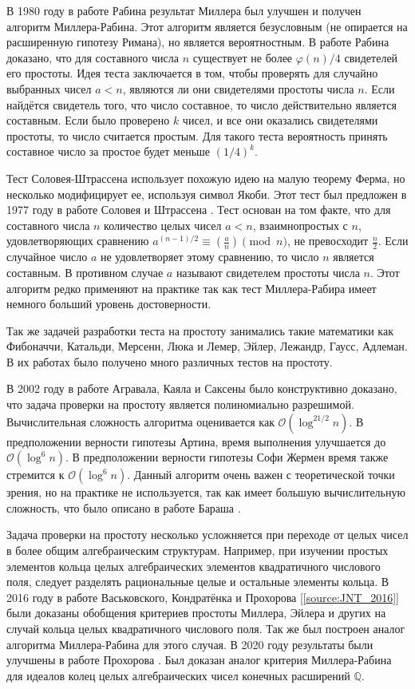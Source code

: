 \documentclass[_00_dissertation.tex]{subfiles}
\begin{document}
В 1980 году в работе Рабина \cite{Rabin} результат Миллера был улучшен и получен алгоритм Миллера-Рабина.
Этот алгоритм является безусловным (не опирается на расширенную гипотезу Римана), но является вероятностным.
В работе Рабина доказано, что для составного числа $n$ существует не более $\varphi(n)/4$ свидетелей его простоты.
Идея теста заключается в том, чтобы проверять для случайно выбранных чисел $a < n$, являются ли они свидетелями простоты числа $n$.
Если найдётся свидетель того, что число составное, то число действительно является составным.
Если было проверено $k$ чисел, и все они оказались свидетелями простоты, то число считается простым.
Для такого теста вероятность принять составное число за простое будет меньше $(1/4)^{k}$.

Тест Соловея-Штрассена использует похожую идею на малую теорему Ферма, но несколько модифицирует ее, используя символ Якоби.
Этот тест был предложен в 1977 году в работе Соловея и Штрассена \cite{Solovay}.
Тест основан на том факте, что для составного числа $n$ количество целых чисел $a < n$, взаимнопростых с $n$, удовлетворяющих сравнению $a^{{(n-1)/2}}\equiv \left({\frac{a}{n}}\right){\pmod{n}}$, не превосходит $\frac{n}{2}$.
Если случайное число $a$ не удовлетворяет этому сравнению, то число $n$ является составным.
В противном случае $a$ называют свидетелем простоты числа $n$.
Этот алгоритм редко применяют на практике так как тест Миллера-Рабира имеет немного больший уровень достоверности.

Так же задачей разработки теста на простоту занимались такие математики как Фибоначчи, Катальди, Мерсенн, Люка и Лемер, Эйлер, Лежандр, Гаусс, Адлеман.
В их работах было получено много различных тестов на простоту.

В 2002 году в работе Агравала, Каяла и Саксены \cite{AKS} было конструктивно доказано, что задача проверки на простоту является полиномиально разрешимой.
Вычислительная сложность алгоритма оценивается как $\mathcal{O}(\log ^{21/2}n)$.
В предположении верности гипотезы Артина, время выполнения улучшается до $\mathcal{O}(\log ^{6}n)$.
В предположении верности гипотезы Софи Жермен время также стремится к $\mathcal{O}(\log ^{6}n)$.
Данный алгоритм очень важен с теоретической точки зрения, но на практике не используется, так как имеет большую вычислительную сложность, что было описано в работе Бараша \cite{Barash}.

Задача проверки на простоту несколько усложняется при переходе от целых чисел в более общим алгебраическим структурам.
Например, при изучении простых элементов кольца целых алгебраических элементов квадратичного числового поля, следует разделять рациональные целые и остальные элементы кольца.
В 2016 году в работе Васьковского, Кондратёнка и Прохорова [\ref{source:JNT_2016}] были доказаны обобщения критериев простоты Миллера, Эйлера и других на случай кольца целых квадратичного числового поля.
Так же был построен аналог алгоритма Миллера-Рабина для этого случая.
В 2020 году результаты были улучшены в работе Прохорова \cite{source:Prochorov}.
Был доказан аналог критерия Миллера-Рабина для идеалов колец целых алгебраических чисел конечных расширений $\mathbb{Q}$.
\end{document}
